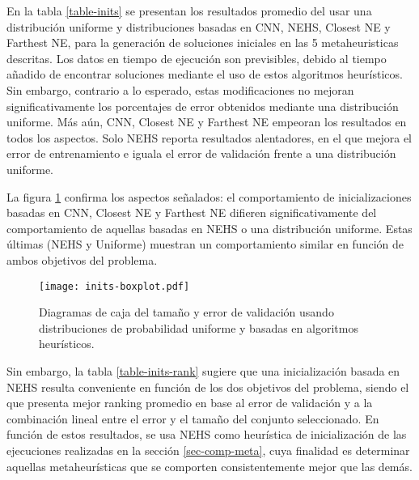 En la tabla \ref{table-inits} se presentan los resultados promedio del usar una distribución uniforme y distribuciones basadas en CNN, NEHS, Closest NE y Farthest NE, para la generación de soluciones iniciales en las 5 metaheuristicas descritas. Los datos en tiempo de ejecución son previsibles, debido al tiempo añadido de encontrar soluciones mediante el uso de estos algoritmos heurísticos. Sin embargo, contrario a lo esperado, estas modificaciones no mejoran significativamente los porcentajes de error obtenidos mediante una distribución uniforme. Más aún, CNN, Closest NE y Farthest NE empeoran los resultados en todos los aspectos. Solo NEHS reporta resultados alentadores, en el que mejora el error de entrenamiento e iguala el error de validación frente a una distribución uniforme.

La figura \ref{fig-inits} confirma los aspectos señalados: el comportamiento de inicializaciones basadas en CNN, Closest NE y Farthest NE difieren significativamente del comportamiento de aquellas basadas en NEHS o una distribución uniforme. Estas últimas (NEHS y Uniforme) muestran un comportamiento similar en función de ambos objetivos del problema.

\begin{figure}[h!]
\centering
\texttt{[image: inits-boxplot.pdf]}
\caption[Tamaño y error de validación usando algoritmos heurísticos]{Diagramas de caja del tamaño y error de validación usando distribuciones de probabilidad uniforme y basadas en algoritmos heurísticos.}
\label{fig-inits}
\end{figure}

Sin embargo, la tabla \ref{table-inits-rank} sugiere que una inicialización basada en NEHS resulta conveniente en función de los dos objetivos del problema, siendo el que presenta mejor ranking promedio en base al error de validación y a la combinación lineal entre el error y el tamaño del conjunto seleccionado. En función de estos resultados, se usa NEHS como heurística de inicialización de las ejecuciones realizadas en la sección \ref{sec-comp-meta}, cuya finalidad es determinar aquellas metaheurísticas que se comporten consistentemente mejor que las demás.


